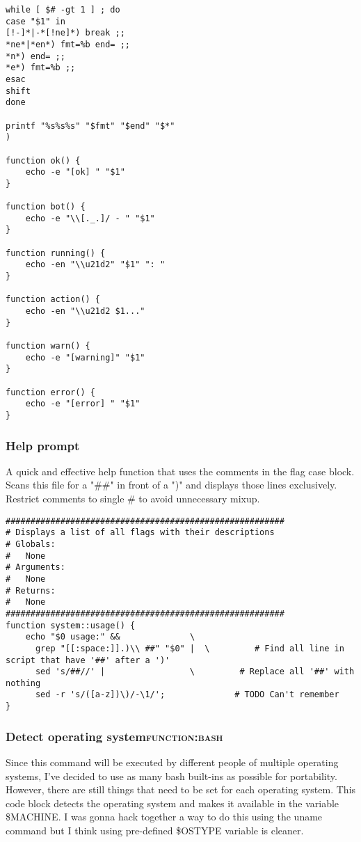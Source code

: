 \documentclass[11pt]{article}
\begin{document}
\begin{verbatim}
while [ $# -gt 1 ] ; do
case "$1" in
[!-]*|-*[!ne]*) break ;;
*ne*|*en*) fmt=%b end= ;;
*n*) end= ;;
*e*) fmt=%b ;;
esac
shift
done

printf "%s%s%s" "$fmt" "$end" "$*"
)

function ok() {
    echo -e "[ok] " "$1"
}

function bot() {
    echo -e "\\[._.]/ - " "$1"
}

function running() {
    echo -en "\\u21d2" "$1" ": "
}

function action() {
    echo -en "\\u21d2 $1..."
}

function warn() {
    echo -e "[warning]" "$1"
}

function error() {
    echo -e "[error] " "$1"
}
\end{verbatim}

\subsubsection{Help prompt}
\label{sec:org02d8846}
A quick and effective help function that uses the comments in the flag case block. Scans this file for a "\#\#" in front of a ")" and displays those lines exclusively.
Restrict comments to single \# to avoid unnecessary mixup.

\begin{verbatim}
########################################################
# Displays a list of all flags with their descriptions
# Globals:
#   None
# Arguments:
#   None
# Returns:
#   None
########################################################
function system::usage() {
    echo "$0 usage:" &&              \
      grep "[[:space:]].)\\ ##" "$0" |  \         # Find all line in script that have '##' after a ')'
      sed 's/##//' |                 \         # Replace all '##' with nothing
      sed -r 's/([a-z])\)/-\1/';              # TODO Can't remember
}
\end{verbatim}
\subsubsection{Detect operating system\hfill{}\textsc{function:bash}}
\label{sec:org84c4553}
Since this command will be executed by different people of multiple operating systems, I've decided to use as many bash built-ins as possible for portability. However, there are still things that need to be set for each operating system. This code block detects the operating system and makes it available in the variable \$MACHINE. I was gonna hack together a way to do this using the uname command but I think using pre-defined \$OSTYPE variable is cleaner.
\end{document}
